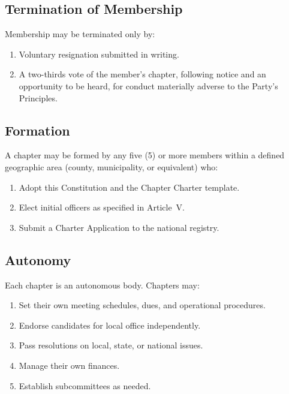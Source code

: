\documentclass[11pt, letterpaper]{article}
\begin{document}
\subsection{Termination of Membership}
Membership may be terminated only by:
\begin{enumerate}
  \item Voluntary resignation submitted in writing.
  \item A two-thirds vote of the member's chapter, following notice and an opportunity to be heard, for conduct materially adverse to the Party's Principles.
\end{enumerate}



\subsection{Formation}
A chapter may be formed by any five (5) or more members within a defined geographic area (county, municipality, or equivalent) who:
\begin{enumerate}
  \item Adopt this Constitution and the Chapter Charter template.
  \item Elect initial officers as specified in Article~V.
  \item Submit a Charter Application to the national registry.
\end{enumerate}

\subsection{Autonomy}
Each chapter is an autonomous body. Chapters may:
\begin{enumerate}
  \item Set their own meeting schedules, dues, and operational procedures.
  \item Endorse candidates for local office independently.
  \item Pass resolutions on local, state, or national issues.
  \item Manage their own finances.
  \item Establish subcommittees as needed.
\end{enumerate}
\end{document}
